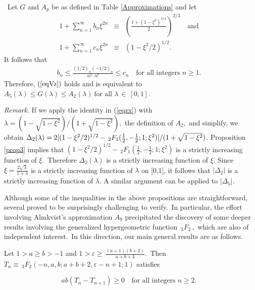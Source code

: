 \documentclass[final,oneeqnum]{siamltex}
\begin{document}
\begin{proposition}
\label{prop3}%
\  Let $G$ and $A_{p}$
be as defined in Table {\rm\ref{Approximations}} and let
\begin{eqnarray}
1+\sum_{n=1}^{\infty}b_{n}\xi^{2n} &\equiv& \left(
\frac{1+(1-\xi^2)^{3/4}}{2}\right) ^{2/3}
\quad \mbox{and} \label{eqRR}\\
 1+\sum_{n=1}^{\infty}c_{n}\xi^{2n} &\equiv& (1-\xi^2/2)^{1/2}.\ \label{eqRR3}
\end{eqnarray} 
It follows that
\begin{eqnarray}
 b_{n}\leq \frac{(1/2)_{n}(-1/2)_{n}}{n!\cdot n!} \leq c_{n} \quad
 \mbox{for all integers $n\geq 1$.}   \nonumber
\end{eqnarray} 
Therefore, $(\ref{eqVz})$ holds and is equivalent to 
$A_{5}(\lambda) \leq G(\lambda)\leq A_{2}(\lambda)\ 
\mbox{for all $\lambda$}   \,\in \,[0,1].\ $\end{proposition}

{\it Remark.} If we apply the identity in
(\ref{eqzx}) with $\lambda = (1-\textstyle\sqrt{1-\xi^2})/(1+\textstyle\sqrt{1-\xi^2}),$
 the definition of $A_2,$ and simplify, we obtain
$\Delta_{2}(\lambda) =
2[(1-\xi^2/2)^{1/2}
-\,_{2}F_{1}(\frac{1}{2},-\frac{1}{2};1;\xi^{2})]/(1\break +\textstyle\sqrt{1-\xi^2})$.
Proposition \ref{prop3} implies that $(1-\xi^2/2)^{1/2}
-\,_{2}F_{1}(\frac{1}{2},-\frac{1}{2};1;\xi^{2})$
is a strictly increasing
function of $\displaystyle \xi$.\ Therefore  $\Delta_{2}(\lambda)$ is a
strictly increasing function of $\displaystyle \xi$.
Since $\xi =
\frac{2\sqrt{\lambda}}{1+\lambda}$
is a strictly increasing
function of $\lambda$ on [0,1],  it follows that $|\Delta_{2}|$ is  a strictly
increasing
function of $\lambda$.
A similar argument can be
applied to $|\Delta_{5}|$.

Although some of the inequalities in the above
propositions are straightforward, several proved to be surprisingly
challenging to verify.\  In particular, the effort  involving Almkvist's
approximation
$A_{9}$ precipitated the discovery of  some deeper results involving the
generalized hypergeometric function $\,_{3}F_{2}\,,$
which are also of independent interest.\   In this direction, our main
general results are as follows.

\begin{theorem}
\label{thm2}%
Let  $1>a\geq b>-1$ and
$1>\varepsilon\geq\,\frac{(a+1)(b+2)}{a+b+4}$.\  Then
$\displaystyle T_{n}\equiv\,_{3}F_{2}\left(-n,a,b;a+b+2,\varepsilon
-n+1;1\right)$ satisfies
\end{theorem}
\[ 
a b (T_{n}- T_{n+1})\geq 0  \quad  \mbox{for all integers $n
\geq 2$.} 
\]
\end{document}
